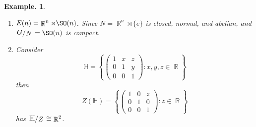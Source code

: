 \documentclass[11pt, a4paper]{memoir}
\makeatletter
\DeclareMathOperator{\R}{{\mathbb{R}}}
\DeclareMathOperator{\C}{{\mathbb{C}}}
\providecommand*{\cupdot}{%
  \mathbin{%
    \mathpalette\@cupdot{}%
  }%
}
\newcommand*{\@cupdot}[2]{%
  \ooalign{%
    $\m@th#1\cup$\cr
    \sbox0{$#1\cup$}%
    \dimen@=\ht0 %
    \sbox0{$\m@th#1\cdot$}%
    \advance\dimen@ by -\ht0 %
    \dimen@=.5\dimen@
    \hidewidth\raise\dimen@\box0\hidewidth
  }%
}
\theoremstyle{change}
\theoremstyle{plain}
\theoremstyle{nonumberplain}
\newtheorem{example}{Example.}
\DeclareMathOperator{\GL}{GL}
\newcommand{\quot}[2]{\mathchoice{\left.\raisebox{0.14em}{$#1$}\middle/\raisebox{-0.14em}{$#2$}\right.}
                                 {\left.\raisebox{0.08em}{$#1$}\middle/\raisebox{-0.08em}{$#2$}\right.}
                                 {\left.\raisebox{0.03em}{$#1$}\middle/\raisebox{-0.03em}{$#2$}\right.}
                                 {\left.\raisebox{0em}{$#1$}\middle/\raisebox{0em}{$#2$}\right.}}
\numberwithin{equation}{section}
\makeatother
\begin{document}
\begin{example}
\begin{enumerate}[r]
            If $\mathfrak{k}=\C$ or $\mathfrak{k}=\R$ and $n$ is odd, $H=G$.
            Else if $\mathfrak{k}=\R$ and $n$ is even, then $H=\GL_n(\R)_e=\det^{-1}((0,\infty))$ (connnected component of $e$) and $G=\GL_n(\R)_e\cupdot(-e)\GL_n(\R)_e$, so $\quot{G}{H}\cong\{-1,1\}$ is compact.
        \item $E(n)=\R^n \rtimes \SO(n)$.
            Since $N=\R^n\rtimes\{e\}$ is closed, normal, and abelian, and $\quot{G}{N}=\SO(n)$ is compact.
        \item Consider
            \begin{equation*}
                \mathbb{H}=\left\{\begin{pmatrix}1&x&z\\0&1&y\\0&0&1\end{pmatrix}:x,y,z\in\R\right\}
            \end{equation*}
            then
            \begin{equation*}
                Z(\mathbb{H})=\left\{\begin{pmatrix}1&0&z\\0&1&0\\0&0&1\end{pmatrix}:z\in\R\right\}
            \end{equation*}
            has $\quot{\mathbb{H}}{Z}\cong\R^2$.
    \end{enumerate}
\end{example}
\end{document}

